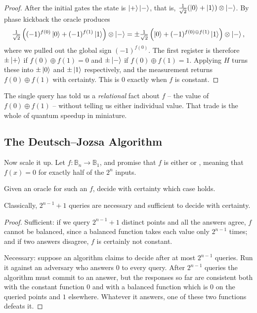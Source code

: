 \documentclass[a4paper]{scrartcl}
\newcommand{\bits}[1]{\mathbb{B}_{#1}}
\begin{document}
\begin{proof}
	After the initial gates the state is $\ket{+}\ket{-}$, that is, $\tfrac1{\sqrt2}(\ket0+\ket1)\otimes\ket-$. By phase kickback the oracle produces
	$$\tfrac{1}{\sqrt2}\left((-1)^{f(0)}\ket0 + (-1)^{f(1)}\ket1\right)\otimes\ket-= \pm\tfrac{1}{\sqrt2}\left(\ket0+(-1)^{f(0)\oplus f(1)}\ket1\right)\otimes\ket-,$$
	where we pulled out the global sign $(-1)^{f(0)}$. The first register is therefore $\pm\ket+$ if $f(0)\oplus f(1) = 0$ and $\pm\ket-$ if $f(0)\oplus f(1)=1$. Applying $H$ turns these into $\pm\ket0$ and $\pm\ket1$ respectively, and the measurement returns $f(0)\oplus f(1)$ with certainty. This is $0$ exactly when $f$ is constant.
\end{proof}

The single query has told us a \emph{relational} fact about $f$ -- the value of $f(0)\oplus f(1)$ -- without telling us either individual value. That trade is the whole of quantum speedup in miniature.

\subsection{The Deutsch--Jozsa Algorithm}

Now scale it up. Let $f:\bits n\to\bits1$, and promise that $f$ is either  or , meaning that $f(x) = 0$ for exactly half of the $2^n$ inputs.

\begin{problem*}
	Given an oracle for such an $f$, decide with certainty which case holds.
\end{problem*}

\begin{proposition}
	Classically, $2^{n-1}+1$ queries are necessary and sufficient to decide with certainty.
\end{proposition}

\begin{proof}
	Sufficient: if we query $2^{n-1}+1$ distinct points and all the answers agree, $f$ cannot be balanced, since a balanced function takes each value only $2^{n-1}$ times; and if two answers disagree, $f$ is certainly not constant.

	Necessary: suppose an algorithm claims to decide after at most $2^{n-1}$ queries. Run it against an adversary who answers $0$ to every query. After $2^{n-1}$ queries the algorithm must commit to an answer, but the responses so far are consistent both with the constant function $0$ and with a balanced function which is $0$ on the queried points and $1$ elsewhere. Whatever it answers, one of these two functions defeats it.
\end{proof}
\end{document}
